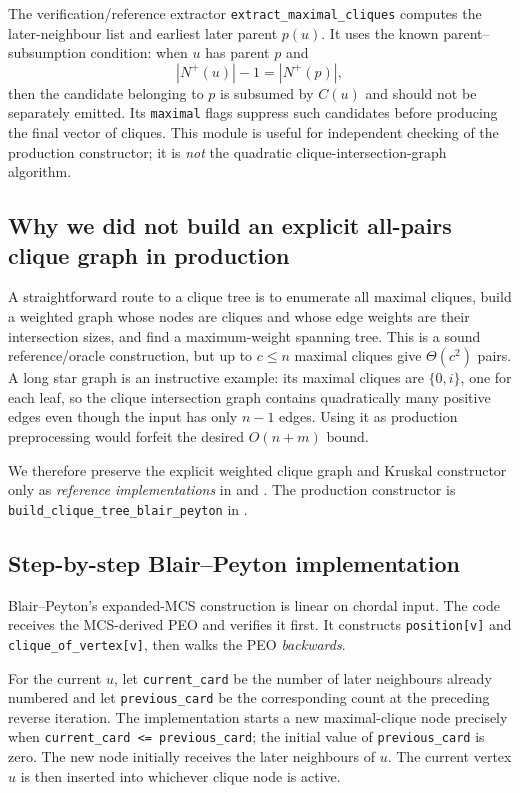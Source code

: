 The verification/reference extractor \texttt{extract\_maximal\_cliques} computes the later-neighbour list and earliest later parent \(p(u)\).  It uses the known parent--subsumption condition: when \(u\) has parent \(p\) and
\[
 |N^+(u)|-1=|N^+(p)|,
\]
then the candidate belonging to \(p\) is subsumed by \(C(u)\) and should not be separately emitted.  Its \texttt{maximal} flags suppress such candidates before producing the final vector of cliques.  This module is useful for independent checking of the production constructor; it is \emph{not} the quadratic clique-intersection-graph algorithm.

\subsection{Why we did not build an explicit all-pairs clique graph in production}
A straightforward route to a clique tree is to enumerate all maximal cliques, build a weighted graph whose nodes are cliques and whose edge weights are their intersection sizes, and find a maximum-weight spanning tree.  This is a sound reference/oracle construction, but up to \(c\le n\) maximal cliques give \(\Theta(c^2)\) pairs.  A long star graph is an instructive example: its maximal cliques are \(\{0,i\}\), one for each leaf, so the clique intersection graph contains quadratically many positive edges even though the input has only \(n-1\) edges.  Using it as production preprocessing would forfeit the desired \(O(n+m)\) bound.

We therefore preserve the explicit weighted clique graph and Kruskal constructor only as \emph{reference implementations} in  and .  The production constructor is \texttt{build\_clique\_tree\_blair\_peyton} in .

\subsection{Step-by-step Blair--Peyton implementation}
Blair--Peyton's expanded-MCS construction is linear on chordal input.  The code receives the MCS-derived PEO and verifies it first.  It constructs \texttt{position[v]} and \texttt{clique\_of\_vertex[v]}, then walks the PEO \emph{backwards}.

For the current \(u\), let \texttt{current\_card} be the number of later neighbours already numbered and let \texttt{previous\_card} be the corresponding count at the preceding reverse iteration.  The implementation starts a new maximal-clique node precisely when \texttt{current\_card <= previous\_card}; the initial value of \texttt{previous\_card} is zero.  The new node initially receives the later neighbours of \(u\).  The current vertex \(u\) is then inserted into whichever clique node is active.

